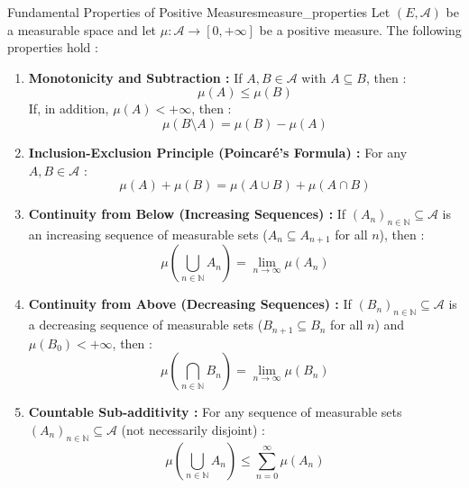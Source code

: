 \begin{property}[breakable]{Fundamental Properties of Positive Measures}{measure_properties}
Let $(E, \mathcal{A})$ be a measurable space and let $\mu : \mathcal{A} \to [0, +\infty]$ be a positive measure. The following properties hold :
\begin{enumerate}
    \item \textbf{Monotonicity and Subtraction :} If $A, B \in \mathcal{A}$ with $A \subseteq B$, then :
    \[
        \mu(A) \le \mu(B)
    \]
    If, in addition, $\mu(A) < +\infty$, then :
    \[
        \mu(B \setminus A) = \mu(B) - \mu(A)
    \]
    \item \textbf{Inclusion-Exclusion Principle (Poincaré's Formula) :} For any $A, B \in \mathcal{A}$ :
    \[
        \mu(A) + \mu(B) = \mu(A \cup B) + \mu(A \cap B)
    \]
    \item \textbf{Continuity from Below (Increasing Sequences) :} If $(A_n)_{n \in \mathbb{N}} \subseteq \mathcal{A}$ is an increasing sequence of measurable sets ($A_n \subseteq A_{n+1}$ for all $n$), then :
    \[
        \mu\left( \bigcup_{n \in \mathbb{N}} A_n \right) = \lim_{n \to \infty} \mu(A_n)
    \]
    \item \textbf{Continuity from Above (Decreasing Sequences) :} If $(B_n)_{n \in \mathbb{N}} \subseteq \mathcal{A}$ is a decreasing sequence of measurable sets ($B_{n+1} \subseteq B_n$ for all $n$) and $\mu(B_0) < +\infty$, then :
    \[
        \mu\left( \bigcap_{n \in \mathbb{N}} B_n \right) = \lim_{n \to \infty} \mu(B_n)
    \]
    \item \textbf{Countable Sub-additivity :} For any sequence of measurable sets $(A_n)_{n \in \mathbb{N}} \subseteq \mathcal{A}$ (not necessarily disjoint) :
    \[
        \mu\left( \bigcup_{n \in \mathbb{N}} A_n \right) \le \sum_{n=0}^\infty \mu(A_n)
    \]
\end{enumerate}
\end{property}


